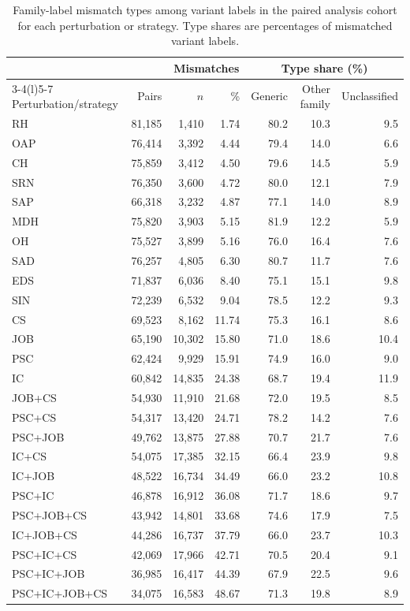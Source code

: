\begin{table}[t]
\centering
\caption{Family-label mismatch types among variant labels in the paired analysis cohort for each perturbation or strategy. Type shares are percentages of mismatched variant labels.}
\label{tab:supp_mismatch_types}
\begin{tabular}{@{}lrrrrrr@{}}
\toprule
 & & \multicolumn{2}{c}{Mismatches} & \multicolumn{3}{c}{Type share (\%)} \\
\cmidrule(lr){3-4}\cmidrule(l){5-7}
Perturbation/strategy & Pairs & $n$ & \% & Generic & Other family & Unclassified \\
\midrule
RH & 81,185 & 1,410 & 1.74 & 80.2 & 10.3 & 9.5 \\
OAP & 76,414 & 3,392 & 4.44 & 79.4 & 14.0 & 6.6 \\
CH & 75,859 & 3,412 & 4.50 & 79.6 & 14.5 & 5.9 \\
SRN & 76,350 & 3,600 & 4.72 & 80.0 & 12.1 & 7.9 \\
SAP & 66,318 & 3,232 & 4.87 & 77.1 & 14.0 & 8.9 \\
MDH & 75,820 & 3,903 & 5.15 & 81.9 & 12.2 & 5.9 \\
OH & 75,527 & 3,899 & 5.16 & 76.0 & 16.4 & 7.6 \\
SAD & 76,257 & 4,805 & 6.30 & 80.7 & 11.7 & 7.6 \\
EDS & 71,837 & 6,036 & 8.40 & 75.1 & 15.1 & 9.8 \\
SIN & 72,239 & 6,532 & 9.04 & 78.5 & 12.2 & 9.3 \\
CS & 69,523 & 8,162 & 11.74 & 75.3 & 16.1 & 8.6 \\
JOB & 65,190 & 10,302 & 15.80 & 71.0 & 18.6 & 10.4 \\
PSC & 62,424 & 9,929 & 15.91 & 74.9 & 16.0 & 9.0 \\
IC & 60,842 & 14,835 & 24.38 & 68.7 & 19.4 & 11.9 \\
\midrule
JOB+CS & 54,930 & 11,910 & 21.68 & 72.0 & 19.5 & 8.5 \\
PSC+CS & 54,317 & 13,420 & 24.71 & 78.2 & 14.2 & 7.6 \\
PSC+JOB & 49,762 & 13,875 & 27.88 & 70.7 & 21.7 & 7.6 \\
IC+CS & 54,075 & 17,385 & 32.15 & 66.4 & 23.9 & 9.8 \\
IC+JOB & 48,522 & 16,734 & 34.49 & 66.0 & 23.2 & 10.8 \\
PSC+IC & 46,878 & 16,912 & 36.08 & 71.7 & 18.6 & 9.7 \\
\midrule
PSC+JOB+CS & 43,942 & 14,801 & 33.68 & 74.6 & 17.9 & 7.5 \\
IC+JOB+CS & 44,286 & 16,737 & 37.79 & 66.0 & 23.7 & 10.3 \\
PSC+IC+CS & 42,069 & 17,966 & 42.71 & 70.5 & 20.4 & 9.1 \\
PSC+IC+JOB & 36,985 & 16,417 & 44.39 & 67.9 & 22.5 & 9.6 \\
\midrule
PSC+IC+JOB+CS & 34,075 & 16,583 & 48.67 & 71.3 & 19.8 & 8.9 \\
\bottomrule
\end{tabular}
\end{table}
